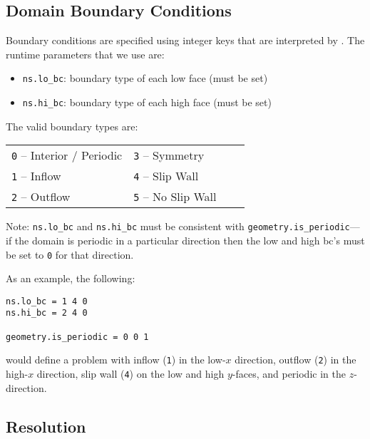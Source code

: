 \subsection{Domain Boundary Conditions}

Boundary conditions are specified using integer keys that are interpreted
by \amrex.  The runtime parameters that we use are:
\begin{itemize}
\item {\tt ns.lo\_bc}: boundary type of each low face  (must be set)
\item {\tt ns.hi\_bc}: boundary type of each high face (must be set)
\end{itemize}

The valid boundary types are:
\begin{table*}[h]
\begin{center}
\begin{tabular}{llll} 
{\tt 0} --  Interior / Periodic \hspace{1.in} & {\tt 3}  --  Symmetry     \hspace{1.in} & \\
{\tt 1} --  Inflow              \hspace{1.in} & {\tt 4}  --  Slip Wall    \hspace{1.in}& \\
{\tt 2} --  Outflow             \hspace{1.in} & {\tt 5}  --  No Slip Wall \hspace{1.in}& \\
\end{tabular}
\end{center}
\end{table*}

\noindent Note: {\tt ns.lo\_bc} and {\tt ns.hi\_bc} must be consistent with 
{\tt geometry.is\_periodic}---if the domain is periodic in a particular
direction then the low and high bc's must be set to {\tt 0} for that direction.

As an example, the following:
\begin{lstlisting}
ns.lo_bc = 1 4 0 
ns.hi_bc = 2 4 0 

geometry.is_periodic = 0 0 1
\end{lstlisting}
would define a problem with inflow ({\tt 1}) in the low-$x$ direction,
outflow ({\tt 2}) in the high-$x$ direction, slip wall ({\tt 4}) on
the low and high $y$-faces, and periodic in the $z$-direction.

\subsection{Resolution}


